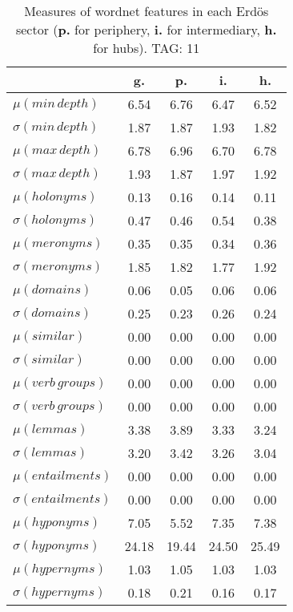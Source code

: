 \begin{table}[h!]
\begin{center}
\begin{tabular}{| l | c | c | c | c |}\hline
 & g. & p. & i. & h. \\\hline
$\mu(min\,depth)$ & 6.54  & 6.76  & 6.47  & 6.52 \\\hline
$\sigma(min\,depth)$ & 1.87  & 1.87  & 1.93  & 1.82 \\\hline
$\mu(max\,depth)$ & 6.78  & 6.96  & 6.70  & 6.78 \\\hline
$\sigma(max\,depth)$ & 1.93  & 1.87  & 1.97  & 1.92 \\\hline
$\mu(holonyms)$ & 0.13  & 0.16  & 0.14  & 0.11 \\\hline
$\sigma(holonyms)$ & 0.47  & 0.46  & 0.54  & 0.38 \\\hline
$\mu(meronyms)$ & 0.35  & 0.35  & 0.34  & 0.36 \\\hline
$\sigma(meronyms)$ & 1.85  & 1.82  & 1.77  & 1.92 \\\hline
$\mu(domains)$ & 0.06  & 0.05  & 0.06  & 0.06 \\\hline
$\sigma(domains)$ & 0.25  & 0.23  & 0.26  & 0.24 \\\hline
$\mu(similar)$ & 0.00  & 0.00  & 0.00  & 0.00 \\\hline
$\sigma(similar)$ & 0.00  & 0.00  & 0.00  & 0.00 \\\hline
$\mu(verb\,groups)$ & 0.00  & 0.00  & 0.00  & 0.00 \\\hline
$\sigma(verb\,groups)$ & 0.00  & 0.00  & 0.00  & 0.00 \\\hline
$\mu(lemmas)$ & 3.38  & 3.89  & 3.33  & 3.24 \\\hline
$\sigma(lemmas)$ & 3.20  & 3.42  & 3.26  & 3.04 \\\hline
$\mu(entailments)$ & 0.00  & 0.00  & 0.00  & 0.00 \\\hline
$\sigma(entailments)$ & 0.00  & 0.00  & 0.00  & 0.00 \\\hline
$\mu(hyponyms)$ & 7.05  & 5.52  & 7.35  & 7.38 \\\hline
$\sigma(hyponyms)$ & 24.18  & 19.44  & 24.50  & 25.49 \\\hline
$\mu(hypernyms)$ & 1.03  & 1.05  & 1.03  & 1.03 \\\hline
$\sigma(hypernyms)$ & 0.18  & 0.21  & 0.16  & 0.17 \\\hline
\end{tabular}
\caption{Measures of wordnet features in each Erd\"os sector ({{\bf p.}} for periphery, {{\bf i.}} for intermediary, {{\bf h.}} for hubs). TAG: 11}
\end{center}
\end{table}